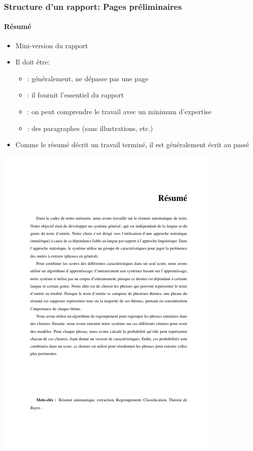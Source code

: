 \documentclass[xcolor=table]{beamer}
\begin{document}
\begin{frame}
\frametitle{Structure d'un rapport: Pages préliminaires}
\framesubtitle{Résumé}

\begin{minipage}{0.60\textwidth}
	\begin{itemize}
		\item Mini-version du rapport
		\item Il doit être:
		\begin{itemize}
			\item {}: généralement, ne dépasse pas une page
			\item {}: il fournit l'essentiel du rapport
			\item {}: on peut comprendre le travail avec un minimum d'expertise
			\item {}: des paragraphes (sans illustrations, etc.)
		\end{itemize}
		\item Comme le résumé décrit un travail terminé, il est généralement écrit au passé
	\end{itemize}
\end{minipage}
\begin{minipage}{0.38\textwidth}
	\includegraphics[width=\textwidth,frame]{..//img/Bweb03-redaction/resume.png}
\end{minipage}

\end{frame}
\end{document}
